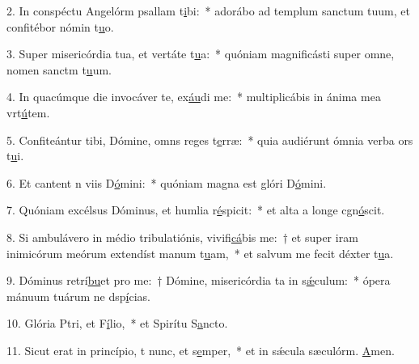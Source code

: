 2. In conspéctu Angelórm psallam t\uline{i}bi:~* adorábo ad templum sanctum tuum, et confitébor nómin t\uline{u}o.\par 
3. Super misericórdia tua, et vertáte t\uline{u}a:~* quóniam magnificásti super omne, nomen sanctm t\uline{u}um.\par 
4. In quacúmque die invocáver te, ex\uline{áu}di me:~* multiplicábis in ánima mea vrt\uline{ú}tem.\par 
5. Confiteántur tibi, Dómine, omns reges t\uline{e}rræ:~* quia audiérunt ómnia verba ors t\uline{u}i.\par 
6. Et cantent n viis D\uline{ó}mini:~* quóniam magna est glóri D\uline{ó}mini.\par 
7. Quóniam excélsus Dóminus, et humlia r\uline{é}spicit:~* et alta a longe cgn\uline{ó}scit.\par 
8. Si ambulávero in médio tribulatiónis, vivifi\uline{cá}bis me:~† et super iram inimicórum meórum extendíst manum t\uline{u}am,~* et salvum me fecit déxter t\uline{u}a.\par 
9. Dóminus retrí\uline{bu}et pro me:~† Dómine, misericórdia ta in s\uline{ǽ}culum:~* ópera mánuum tuárum ne dsp\uline{í}cias.\par 
10. Glória Ptri, et F\uline{í}lio,~* et Spirítu S\uline{a}ncto.\par 
11. Sicut erat in princípio, t nunc, et s\uline{e}mper,~* et in sǽcula sæculórm. \uline{A}men.\par 
